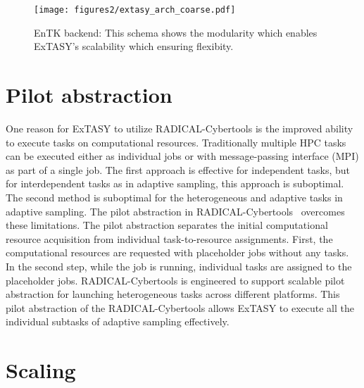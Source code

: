 {\begin{figure}[H]
 \centering
  \texttt{[image: figures2/extasy\_arch\_coarse.pdf]}
  \caption{EnTK backend: This schema shows the modularity which enables ExTASY's scalability which ensuring flexibity.  
  }\label{fig:extasy_arch}
\end{figure}


\section{Pilot abstraction} 
One reason for ExTASY to utilize RADICAL-Cybertools is the improved ability to execute tasks on computational resources. Traditionally multiple HPC tasks can be executed either as individual jobs or with message-passing interface (MPI) as part of a single job. The first approach is effective for independent tasks, but for interdependent tasks as in adaptive sampling, this approach is suboptimal. The second method is suboptimal for the heterogeneous and adaptive tasks in adaptive sampling. The pilot abstraction in RADICAL-Cybertools~\cite{turilli2018comprehensive} overcomes these limitations.  The pilot abstraction separates the initial computational resource acquisition from individual task-to-resource assignments. First, the computational resources are requested with placeholder jobs without any tasks. In the second step, while the job is running, individual tasks are assigned to the placeholder jobs. RADICAL-Cybertools is engineered to support scalable pilot abstraction for launching heterogeneous tasks across different platforms. This pilot abstraction of the RADICAL-Cybertools allows ExTASY to execute all the individual subtasks of adaptive sampling effectively.  

\section{\label{sec:scaling}Scaling}


}
